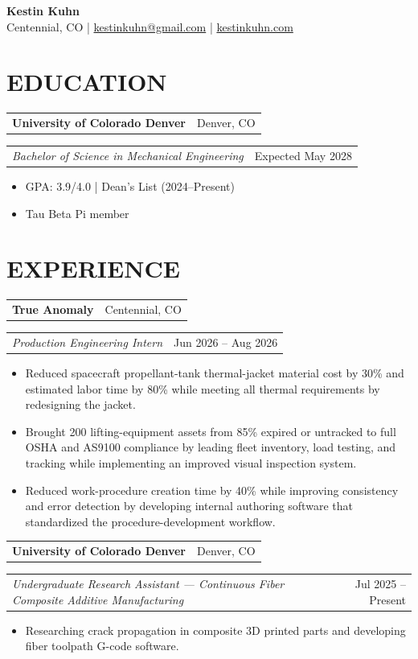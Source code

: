\documentclass[10pt]{article}
\makeatletter
\newcommand{\companyLine}[2]{
\noindent
\begin{tabular*}{\textwidth}{@{\extracolsep{\fill}} l r}
\textbf{#1} & #2 \\
\end{tabular*}
}
\newcommand{\roleLine}[2]{
\noindent
\begin{tabular*}{\textwidth}{@{\extracolsep{\fill}} l r}
\textit{#1} & #2 \\
\end{tabular*}
}
\makeatother
\begin{document}
\begin{center}
{\Large \textbf{Kestin Kuhn}} \\
Centennial, CO \quad | \quad
\href{mailto:kestinkuhn@gmail.com}{kestinkuhn@gmail.com}
\quad | \quad
\href{https://kestinkuhn.com}{kestinkuhn.com}
\end{center}

\section*{EDUCATION}
\companyLine{University of Colorado Denver}{Denver, CO}
\roleLine{Bachelor of Science in Mechanical Engineering}{Expected May 2028}
\begin{itemize}
\item GPA: 3.9/4.0 | Dean's List (2024--Present)
\item Tau Beta Pi member
\end{itemize}

\section*{EXPERIENCE}
\companyLine{True Anomaly}{Centennial, CO}
\roleLine{Production Engineering Intern}{Jun 2026 -- Aug 2026}
\begin{itemize}
    \item Reduced spacecraft propellant-tank thermal-jacket material cost by 30\% and estimated labor time by 80\% while meeting all thermal requirements by redesigning the jacket.
    
    
    \item Brought 200 lifting-equipment assets from 85\% expired or untracked to full OSHA and AS9100 compliance by leading fleet inventory, load testing, and tracking while implementing an improved visual inspection system.
    
    \item Reduced work-procedure creation time by 40\% while improving consistency and error detection by developing internal authoring software that standardized the procedure-development workflow.
\end{itemize}

\vspace{.2em}

\companyLine{University of Colorado Denver}{Denver, CO}
\roleLine{Undergraduate Research Assistant --- Continuous Fiber Composite Additive Manufacturing}{Jul 2025 -- Present}
\begin{itemize}
    \item Researching crack propagation in composite 3D printed parts and developing fiber toolpath G-code software.
\end{itemize}
\end{document}
